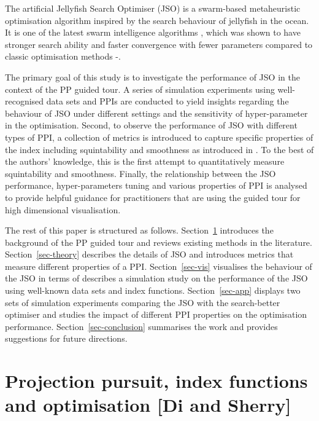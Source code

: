 \documentclass[
  number,
  preprint,
  3p]{elsarticle}
\begin{document}
The artificial Jellyfish Search Optimiser (JSO) \citep{chou_novel_2021}
is a swarm-based metaheuristic optimisation algorithm inspired by the
search behaviour of jellyfish in the ocean. It is one of the latest
swarm intelligence algorithms \citep{rajwar_exhaustive_2023}, which was
shown to have stronger search ability and faster convergence with fewer
parameters compared to classic optimisation methods
\citep{chou_novel_2021}-\citep{chou_recent_2022}.

The primary goal of this study is to investigate the performance of JSO
in the context of the PP guided tour. A series of simulation experiments
using well-recognised data sets and PPIs are conducted to yield insights
regarding the behaviour of JSO under different settings and the
sensitivity of hyper-parameter in the optimisation. Second, to observe
the performance of JSO with different types of PPI, a collection of
metrics is introduced to capture specific properties of the index
including squintability and smoothness as introduced in
\citet{laa_using_2020}. To the best of the authors' knowledge, this is
the first attempt to quantitatively measure squintability and
smoothness. Finally, the relationship between the JSO performance,
hyper-parameters tuning and various properties of PPI is analysed to
provide helpful guidance for practitioners that are using the guided
tour for high dimensional visualisation.

The rest of this paper is structured as follows.
Section~\ref{sec-background} introduces the background of the PP guided
tour and reviews existing methods in the literature.
Section~\ref{sec-theory} describes the details of JSO and introduces
metrics that measure different properties of a PPI.
Section~\ref{sec-vis} visualises the behaviour of the JSO in terms of
describes a simulation study on the performance of the JSO using
well-known data sets and index functions. Section~\ref{sec-app} displays
two sets of simulation experiments comparing the JSO with the
search-better optimiser and studies the impact of different PPI
properties on the optimisation performance. Section~\ref{sec-conclusion}
summarises the work and provides suggestions for future directions.

\hypertarget{sec-background}{%
\section{Projection pursuit, index functions and optimisation {[}Di and
Sherry{]}}\label{sec-background}}
\end{document}
